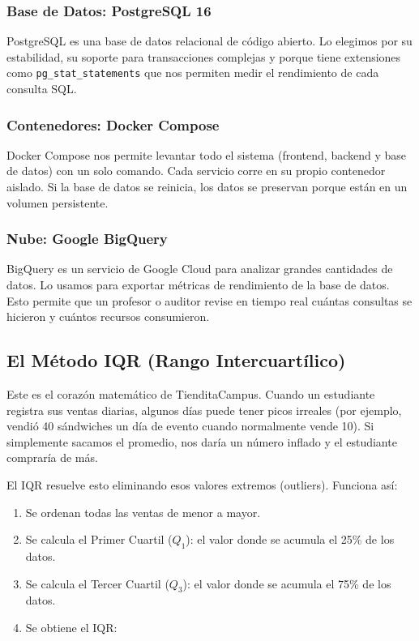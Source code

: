\documentclass[12pt, a4paper]{article}
\begin{document}
\subsubsection{Base de Datos: PostgreSQL 16}
PostgreSQL es una base de datos relacional de código abierto. Lo elegimos por su estabilidad, su soporte para transacciones complejas y porque tiene extensiones como \texttt{pg\_stat\_statements} que nos permiten medir el rendimiento de cada consulta SQL.

\subsubsection{Contenedores: Docker Compose}
Docker Compose nos permite levantar todo el sistema (frontend, backend y base de datos) con un solo comando. Cada servicio corre en su propio contenedor aislado. Si la base de datos se reinicia, los datos se preservan porque están en un volumen persistente.

\subsubsection{Nube: Google BigQuery}
BigQuery es un servicio de Google Cloud para analizar grandes cantidades de datos. Lo usamos para exportar métricas de rendimiento de la base de datos. Esto permite que un profesor o auditor revise en tiempo real cuántas consultas se hicieron y cuántos recursos consumieron.

\subsection{El Método IQR (Rango Intercuartílico)}
Este es el corazón matemático de TienditaCampus. Cuando un estudiante registra sus ventas diarias, algunos días puede tener picos irreales (por ejemplo, vendió 40 sándwiches un día de evento cuando normalmente vende 10). Si simplemente sacamos el promedio, nos daría un número inflado y el estudiante compraría de más.

El IQR resuelve esto eliminando esos valores extremos (outliers). Funciona así:

\begin{enumerate}
    \item Se ordenan todas las ventas de menor a mayor.
    \item Se calcula el Primer Cuartil ($Q_1$): el valor donde se acumula el 25\% de los datos.
    \item Se calcula el Tercer Cuartil ($Q_3$): el valor donde se acumula el 75\% de los datos.
    \item Se obtiene el IQR:
\end{enumerate}
\end{document}
